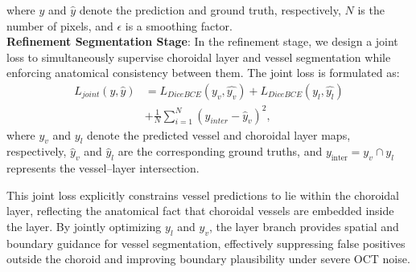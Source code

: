 \documentclass[lettersize,journal]{IEEEtran}
\begin{document}
where $y$ and $\hat{y}$ denote the prediction and ground truth, respectively, $N$ is the number of pixels, and $\epsilon$ is a smoothing factor.\\
\textbf{Refinement Segmentation Stage}: In the refinement stage, we design a joint loss to simultaneously supervise choroidal layer and vessel segmentation while enforcing anatomical consistency between them.
The joint loss is formulated as:
\begin{equation}
\begin{aligned}
L_{joint}(y,\hat y)&=L_{DiceBCE}(y_v,\hat{y_v})+L_{DiceBCE}(y_l,\hat{y_l})
\\&+\frac{1}{N} \sum_{i=1}^{N} (y_{inter} - \hat{y}_v)^2,
\end{aligned}
\label{eq:loss_refining}
\end{equation}
where $y_v$ and $y_l$ denote the predicted vessel and choroidal layer maps, respectively, $\hat{y}_v$ and $\hat{y}_l$ are the corresponding ground truths, and $y_{\text{inter}} = y_v \cap y_l$ represents the vessel--layer intersection.

{\color{red}
This joint loss explicitly constrains vessel predictions to lie within the choroidal layer, reflecting the anatomical fact that choroidal vessels are embedded inside the layer.
By jointly optimizing $y_l$ and $y_v$, the layer branch provides spatial and boundary guidance for vessel segmentation, effectively suppressing false positives outside the choroid and improving boundary plausibility under severe OCT noise.}
\end{document}
